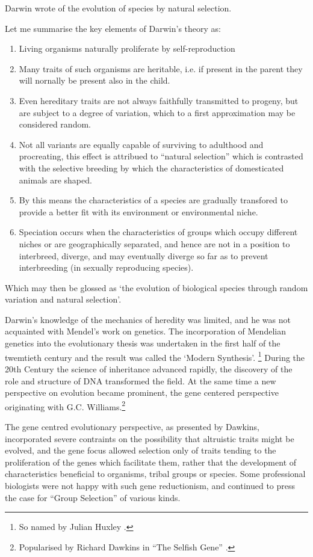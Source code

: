 {Darwin wrote of the evolution of species by natural selection.

Let me summarise the key elements of Darwin's theory as:

\begin{enumerate}[label=\Alph*]
\item Living organisms naturally proliferate by self-reproduction 
\item Many traits of such organisms are heritable, i.e. if present in the parent they will nornally be present also in the child.
\item Even hereditary traits are not always faithfully transmitted to progeny, but are subject to a degree of variation, which to a first approximation may be considered random.
\item Not all variants are equally capable of surviving to adulthood and procreating, this effect is attribued to ``natural selection'' which is contrasted with the selective breeding by which the characteristics of domesticated animals are shaped.
\item By this means the characteristics of a species are gradually transfored to provide a better fit with its environment or environmental niche.
  \item Speciation occurs when the characteristics of groups which occupy different niches or are geographically separated, and hence are not in a position to interbreed, diverge, and may eventually diverge so far as to prevent interbreeding (in sexually reproducing species).
\end{enumerate}

Which may then be glossed as `the evolution of biological species through random variation and natural selection'.

Darwin's knowledge of the mechanics of heredity was limited, and he was not acquainted with Mendel's work on genetics.
The incorporation of Mendelian genetics into the evolutionary thesis was undertaken
in the first half of the twemtieth century and the result was called the `Modern Synthesis'. \footnote{So named by Julian Huxley \cite{huxley-tms}.}
During the 20th Century the science of inheritance advanced rapidly, the discovery of the role and structure of DNA transformed the field.
At the same time a new perspective on evolution became prominent, the gene centered perspective originating with G.C. Williams.\footnote{Popularised by Richard Dawkins in ``The Selfish Gene'' \cite{dawkinsSG}.}

The gene centred evolutionary perspective, as presented by Dawkins, incorporated severe contraints on the possibility that altruistic traits might be evolved, and the gene focus allowed selection only of traits tending to the proliferation of the genes which facilitate them, rather that the development of characteristics beneficial to organisms, tribal groups or species.
Some professional biologists were not happy with such gene reductionism, and continued to press the case for ``Group Selection'' of various kinds.

}
